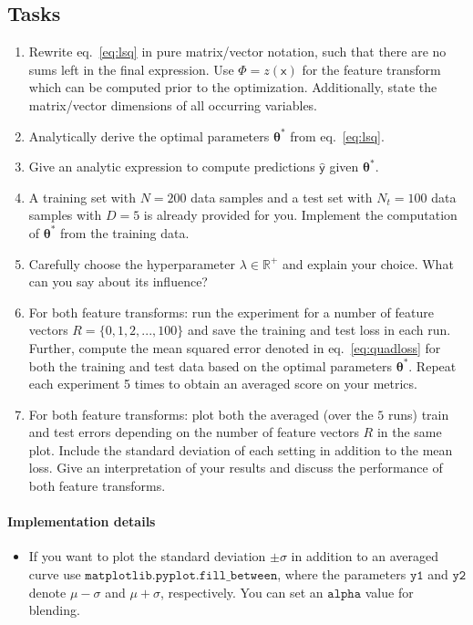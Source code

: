 \documentclass{article}
\newcommand{\R}{\mathbb{R}}
\begin{document}
\subsection*{Tasks}
\begin{enumerate}
    \item Rewrite eq.~\eqref{eq:lsq} in pure matrix/vector notation, such that there are no sums left in the final expression. Use $\Phi = z(\boldsymbol{\mathsf{x}})$ for the feature transform which can be computed prior to the optimization.
    Additionally, state the matrix/vector dimensions of all occurring variables.
    \item Analytically derive the optimal parameters $\bm \theta^\ast$ from eq.~\eqref{eq:lsq}.
        \item Give an analytic expression to compute predictions $\hat{\boldsymbol{\mathsf{y}}}$ given $\bm \theta^\ast$.   
     \item A training set with $N=200$ data samples and a test set with $N_{t}=100$ data samples with $D=5$ is already provided for you. Implement the computation of $\bm \theta^\ast$ from the training data. 
     \item Carefully choose the hyperparameter $\lambda \in \R^+$ and explain your choice. What can you say about its influence?
     \item For both feature transforms: run the experiment for a number of feature vectors $R =  \{0,1,2,...,100\}$ and save the training and test loss in each run. 
     Further, compute the mean squared error denoted in eq.~\eqref{eq:quadloss} for both the training and test data based on the optimal parameters $\bm \theta^\ast$.
     Repeat each experiment 5 times to obtain an averaged score on your metrics. 
		\item For both feature transforms: plot both the averaged (over the $5$ runs) train and test errors depending on the number of feature vectors $R$ in the same plot. Include the standard deviation of each setting in addition to the mean loss. Give an interpretation of your results and discuss the performance of both feature transforms.
\end{enumerate}


\paragraph{Implementation details}
\begin{itemize}
    \item If you want to plot the standard deviation $\pm \sigma$ in addition to an averaged curve use $\texttt{matplotlib.pyplot.fill\_between}$, where the parameters $\texttt{y1}$ and $\texttt{y2}$ denote $\mu - \sigma$ and $\mu + \sigma$, respectively. You can set an $\texttt{alpha}$ value for blending.
\end{itemize}
\end{document}

